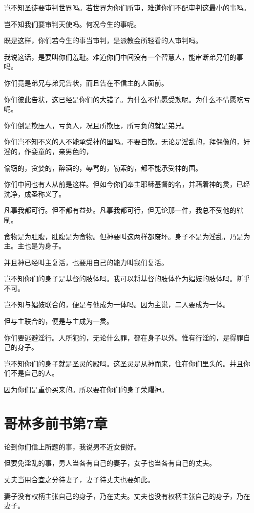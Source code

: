 \documentclass[12pt,oneside]{book}
\begin{document}
岂不知圣徒要审判世界吗。若世界为你们所审，难道你们不配审判这最小的事吗。

岂不知我们要审判天使吗。何况今生的事呢。

既是这样，你们若今生的事当审判，是派教会所轻看的人审判吗。

我说这话，是要叫你们羞耻。难道你们中间没有一个智慧人，能审断弟兄们的事吗。

你们竟是弟兄与弟兄告状，而且告在不信主的人面前。

你们彼此告状，这已经是你们的大错了。为什么不情愿受欺呢。为什么不情愿吃亏呢。

你们倒是欺压人，亏负人，况且所欺压，所亏负的就是弟兄。

你们岂不知不义的人不能承受神的国吗。不要自欺。无论是淫乱的，拜偶像的，奸淫的，作娈童的，亲男色的，

偷窃的，贪婪的，醉酒的，辱骂的，勒索的，都不能承受神的国。

你们中间也有人从前是这样。但如今你们奉主耶稣基督的名，并藉着神的灵，已经洗净，成圣称义了。

凡事我都可行。但不都有益处。凡事我都可行，但无论那一件，我总不受他的辖制。

食物是为肚腹，肚腹是为食物。但神要叫这两样都废坏。身子不是为淫乱，乃是为主。主也是为身子。

并且神已经叫主复活，也要用自己的能力叫我们复活。

岂不知你们的身子是基督的肢体吗。我可以将基督的肢体作为娼妓的肢体吗。断乎不可。

岂不知与娼妓联合的，便是与他成为一体吗。因为主说，二人要成为一体。

但与主联合的，便是与主成为一灵。

你们要逃避淫行。人所犯的，无论什么罪，都在身子以外。惟有行淫的，是得罪自己的身子。

岂不知你们的身子就是圣灵的殿吗。这圣灵是从神而来，住在你们里头的。并且你们不是自己的人。

因为你们是重价买来的。所以要在你们的身子荣耀神。

\chapter{哥林多前书第7章}
论到你们信上所题的事，我说男不近女倒好。

但要免淫乱的事，男人当各有自己的妻子，女子也当各有自己的丈夫。

丈夫当用合宜之分待妻子，妻子待丈夫也要如此。

妻子没有权柄主张自己的身子，乃在丈夫。丈夫也没有权柄主张自己的身子，乃在妻子。
\end{document}
